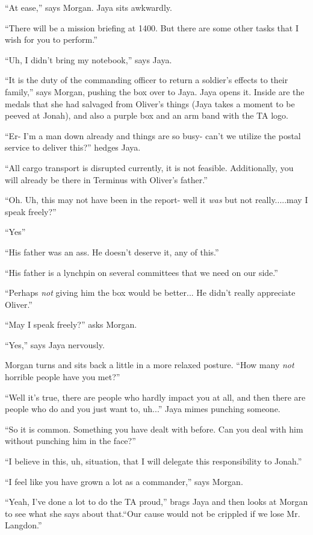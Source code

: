 ``At ease,'' says Morgan.  Jaya sits awkwardly.

``There will be a mission briefing at 1400.  But there are some other tasks that I wish for you to perform.''

``Uh, I didn't bring my notebook,'' says Jaya.

``It is the duty of the commanding officer to return a soldier's effects to their family,'' says Morgan, pushing the box over to Jaya.  Jaya opens it.  Inside are the medals that she had salvaged from Oliver's things (Jaya takes a moment to be peeved at Jonah), and also a purple box and an arm band with the TA logo.

``Er- I'm a man down already and things are so busy- can't we utilize the postal service to deliver this?'' hedges Jaya.

``All cargo transport is disrupted currently, it is not feasible.  Additionally, you will already be there in Terminus with Oliver's father.''

``Oh.  Uh, this may not have been in the report- well it \textit{was} but not really.....may I speak freely?''

``Yes''

``His father was an ass.  He doesn't deserve it, any of this.''

``His father is a lynchpin on several committees that we need on our side.''

``Perhaps \textit{not} giving him the box would be better... He didn't really appreciate Oliver.''

``May I speak freely?'' asks Morgan.

``Yes,'' says Jaya nervously.

Morgan turns and sits back a little in a more relaxed posture.  ``How many \textit{not} horrible people have you met?''

``Well it's true, there are people who hardly impact you at all, and then there are people who do and you just want to, uh...'' Jaya mimes punching someone.

``So it is common.  Something you have dealt with before.  Can you deal with him without punching him in the face?''

``I believe in this, uh, situation, that I will delegate this responsibility to Jonah.''

``I feel like you have grown a lot as a commander,'' says Morgan.

``Yeah, I've done a lot to do the TA proud,'' brags Jaya and then looks at Morgan to see what she says about that.``Our cause would not be crippled if we lose Mr. Langdon.''

